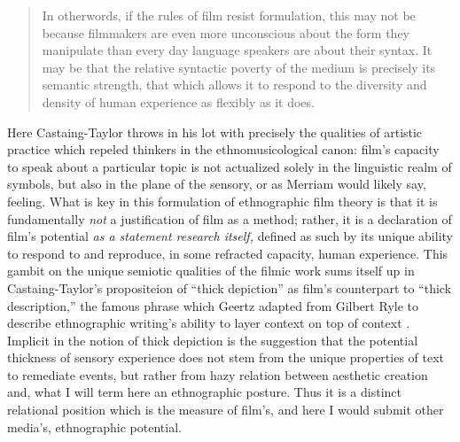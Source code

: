 \begin{quote}
In otherwords, if the rules of film resist formulation, this may not be
because filmmakers are even more unconscious about the form they
manipulate than every day language speakers are about their syntax. It
may be that the relative syntactic poverty of the medium is precisely
its semantic strength, that which allows it to respond to the diversity
and density of human experience as flexibly as it does.
\autocite*[86-87]{taylor_iconophobia:_1996}
\end{quote}

\noindent Here Castaing-Taylor throws in his lot with precisely the
qualities of artistic practice which repeled thinkers in the
ethnomusicological canon: film's capacity to speak about a particular
topic is not actualized solely in the linguistic realm of symbols, but
also in the plane of the sensory, or as Merriam would likely say,
feeling. What is key in this formulation of ethnographic film theory is
that it is fundamentally \emph{not} a justification of film as a method;
rather, it is a declaration of film's potential \emph{as a statement
research itself,} defined as such by its unique ability to respond to
and reproduce, in some refracted capacity, human experience. This gambit
on the unique semiotic qualities of the filmic work sums itself up in
Castaing-Taylor's propositeion of ``thick depiction'' as film's
counterpart to ``thick description,'' the famous phrase which Geertz
adapted from Gilbert Ryle to describe ethnographic writing's ability to
layer context on top of context \autocite[6]{geertz_thick_1973}.
Implicit in the notion of thick depiction is the suggestion that the
potential thickness of sensory experience does not stem from the unique
properties of text to remediate events, but rather from hazy relation
between aesthetic creation and, what I will term here an ethnographic
posture. Thus it is a distinct relational position which is the measure
of film's, and here I would submit other media's, ethnographic
potential.
